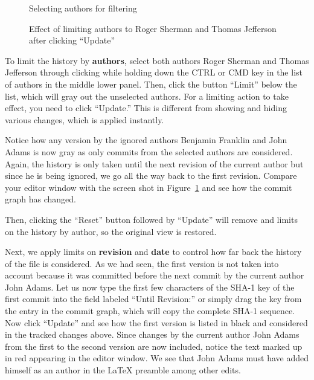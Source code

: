 \begin{figure}
\centering
  \begin{minipage}[t]{0.28\linewidth}
  \centering
  \caption{Selecting authors for filtering} \label{fig:editor-select-authors}
  \end{minipage}%
\hspace{0.04\linewidth}%
  \begin{minipage}[t]{0.68\linewidth}
  \centering
  \caption{Effect of limiting authors to Roger Sherman and Thomas Jefferson after clicking ``Update''} \label{fig:editor-limit-authors}
  \end{minipage}  
\end{figure}
To limit the history by \textbf{authors}, select both authors Roger Sherman and Thomas Jefferson through clicking while holding down the CTRL or CMD key in the list of authors in the middle lower panel.  Then, click the button ``Limit'' below the list, which will gray out the unselected authors.  For a limiting action to take effect, you need to click ``Update.''  This is different from showing and hiding various changes, which is applied instantly.

Notice how any version by the ignored authors Benjamin Franklin and John Adams is now gray as only commits from the selected authors are considered.  Again, the history is only taken until the next revision of the current author but since he is being ignored, we go all the way back to the first revision. Compare your editor window with the screen shot in Figure~\ref{fig:editor-limit-authors} and see how the commit graph has changed.

Then, clicking the ``Reset'' button followed by ``Update'' will remove and limits on the history by author, so the original view is restored.


Next, we apply limits on \textbf{revision} and \textbf{date} to control how far back the history of the file is considered.  As we had seen, the first version is not taken into account because it was committed before the next commit by the current author John Adams.  Let us now type the first few characters  of the SHA-1 key of the first commit into the field labeled ``Until Revision:'' or simply drag the key from the entry in the commit graph, which will copy the complete SHA-1 sequence.  Now click ``Update'' and see how the first version is listed in black and considered in the tracked changes above.  Since changes by the current author John Adams from the first to the second version are now included, notice the text marked up in red appearing in the editor window. We see that John Adams must have added himself as an author in the LaTeX preamble among other edits.

